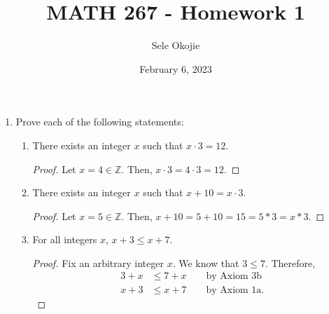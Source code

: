 \documentclass{article}
\title{MATH 267 - Homework 1}
\author{Sele Okojie}
\date{February 6, 2023}
\begin{document}
    \maketitle
    
    \begin{enumerate}

    	\item Prove each of the following statements:
    		\begin{enumerate}
      
    			\item There exists an integer $x$ such that $x \cdot 3 = 12$.
                        \begin{proof}
                            Let $x = 4 \in \mathbb{Z}$. Then, $x \cdot 3 = 4 \cdot 3 = 12$.
                        \end{proof}

    			\item There exists an integer $x$ such that $x + 10 = x \cdot 3$.
                        \begin{proof}
                            Let $x = 5 \in \mathbb{Z}$. Then, $x + 10 = 5 + 10 = 15 = 5 * 3 = x * 3$.
                        \end{proof}

    			\item For all integers $x$, $x + 3 \le x + 7$.
                        \begin{proof}
                            Fix an arbitrary integer $x$. We know that $3 \leq 7$. Therefore,
                            \begin{align*}
                                3 + x &\le 7 + x            \qquad\textrm{by Axiom 3b}      \\  %
                                x + 3 &\le x + 7            \qquad\textrm{by Axiom 1a.} %
                            \end{align*}
                        \end{proof}


\end{enumerate}
\end{enumerate}
\end{document}
